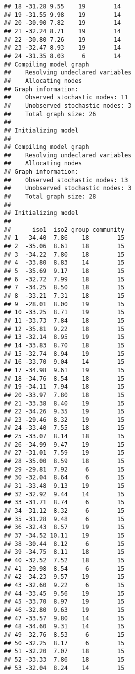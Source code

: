 \documentclass[
]{article}
\begin{document}
\begin{verbatim}
## 18 -31.28 9.55    19        14
## 19 -31.55 9.98    19        14
## 20 -30.90 7.82    19        14
## 21 -32.24 8.71    19        14
## 22 -30.80 7.26    19        14
## 23 -32.47 8.93    19        14
## 24 -31.35 8.03     6        14
## Compiling model graph
##    Resolving undeclared variables
##    Allocating nodes
## Graph information:
##    Observed stochastic nodes: 11
##    Unobserved stochastic nodes: 3
##    Total graph size: 26
## 
## Initializing model
## 
## Compiling model graph
##    Resolving undeclared variables
##    Allocating nodes
## Graph information:
##    Observed stochastic nodes: 13
##    Unobserved stochastic nodes: 3
##    Total graph size: 28
## 
## Initializing model
## 
##      iso1  iso2 group community
## 1  -34.40  7.86    18        15
## 2  -35.06  8.61    18        15
## 3  -34.22  7.80    18        15
## 4  -33.80  8.83    14        15
## 5  -35.69  9.17    18        15
## 6  -32.72  7.99    18        15
## 7  -34.25  8.50    18        15
## 8  -33.21  7.31    18        15
## 9  -28.01  8.00    19        15
## 10 -33.25  8.71    19        15
## 11 -33.73  7.84    18        15
## 12 -35.81  9.22    18        15
## 13 -32.14  8.95    19        15
## 14 -33.83  8.70    18        15
## 15 -32.74  8.94    19        15
## 16 -33.70  9.04    14        15
## 17 -34.98  9.61    19        15
## 18 -34.76  8.54    18        15
## 19 -34.11  7.94    18        15
## 20 -33.97  7.80    18        15
## 21 -33.38  8.40    19        15
## 22 -34.26  9.35    19        15
## 23 -29.46  8.32    19        15
## 24 -33.40  7.55    18        15
## 25 -33.07  8.14    18        15
## 26 -34.99  9.47    19        15
## 27 -31.01  7.59    19        15
## 28 -35.00  8.59    18        15
## 29 -29.81  7.92     6        15
## 30 -32.04  8.64     6        15
## 31 -33.48  9.13    19        15
## 32 -32.92  9.44    14        15
## 33 -31.71  8.74     6        15
## 34 -31.12  8.32     6        15
## 35 -31.28  9.48     6        15
## 36 -32.43  8.57    19        15
## 37 -34.52 10.11    19        15
## 38 -30.44  8.12     6        15
## 39 -34.75  8.11    18        15
## 40 -32.52  7.52    18        15
## 41 -29.98  8.54     6        15
## 42 -34.23  9.57    19        15
## 43 -32.60  9.22     6        15
## 44 -33.45  9.56    19        15
## 45 -33.70  8.97    19        15
## 46 -32.80  9.63    19        15
## 47 -33.57  9.80    14        15
## 48 -34.60  9.31    14        15
## 49 -32.76  8.53     6        15
## 50 -32.25  8.17     6        15
## 51 -32.20  7.07    18        15
## 52 -33.33  7.86    18        15
## 53 -32.04  8.24    14        15

\end{verbatim}
\end{document}
